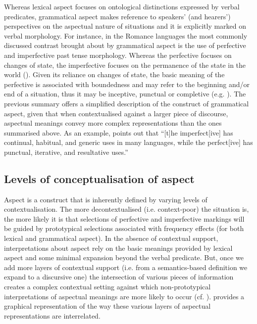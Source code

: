 \documentclass[output=paper,modfonts,nonflat,newtxmath]{langsci/langscibook}
\begin{document}
Whereas lexical aspect focuses on ontological distinctions expressed by verbal predicates, grammatical aspect makes reference to speakers’ (and hearers’) perspectives on the aspectual nature of situations and it is explicitly marked on verbal morphology. For instance, in the Romance languages the most commonly discussed contrast brought about by grammatical aspect is the use of perfective and imperfective past tense morphology. Whereas the perfective focuses on changes of state, the imperfective focuses on the permanence of the state in the world (\citealt{Klein1994,CaudalRoussarie2005}). Given its reliance on changes of state, the basic meaning of the perfective is associated with boundedness and may refer to the beginning and/or end of a situation, thus it may be inceptive, punctual or completive (e.g. \citealt{Depraetre1995}). The previous summary offers a simplified description of the construct of grammatical aspect, given that when contextualised against a larger piece of discourse, aspectual meanings convey more complex representations than the ones summarised above. As an example, \citet[156]{Binnick1991} points out that “[t]he imperfect[ive] has continual, habitual, and generic uses in many languages, while the perfect[ive] has punctual, iterative, and resultative uses.”

\subsection{Levels of conceptualisation of aspect}%
\label{sec:salaberry:1.2}


Aspect is a construct that is inherently defined by varying levels of contextualisation. The more decontextualised (i.e. context-poor) the situation is, the more likely it is that selections of perfective and imperfective markings will be guided by prototypical selections associated with frequency effects (for both lexical and grammatical aspect). In the absence of contextual support, interpretations about aspect rely on the basic meanings provided by lexical aspect and some minimal expansion beyond the verbal predicate. But, once we add more layers of contextual support (i.e. from a semantics-based definition we expand to a discursive one) the intersection of various pieces of information creates a complex contextual setting against which non-prototypical interpretations of aspectual meanings are more likely to occur (cf. \citealt{Binnick1991,Doiz2002}).  provides a graphical representation of the way these various layers of aspectual representations are interrelated.
\end{document}
